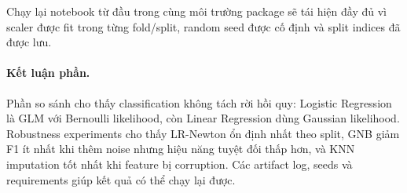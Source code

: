 \documentclass[12pt,a4paper]{article}
\begin{document}
\begin{table}[htbp]
\centering
\caption{Runtime/memory mean trong các kịch bản chính.}
\end{table}

Chạy lại notebook từ đầu trong cùng môi trường package sẽ tái hiện đầy đủ vì scaler được fit trong từng fold/split, random seed được cố định và split indices đã được lưu.
\pagebreak
\paragraph{Kết luận phần.}
Phần so sánh cho thấy classification không tách rời hồi quy: Logistic Regression là GLM với Bernoulli likelihood, còn Linear Regression dùng Gaussian likelihood. Robustness experiments cho thấy LR-Newton ổn định nhất theo split, GNB giảm F1 ít nhất khi thêm noise nhưng hiệu năng tuyệt đối thấp hơn, và KNN imputation tốt nhất khi feature bị corruption. Các artifact log, seeds và requirements giúp kết quả có thể chạy lại được.
\end{document}
